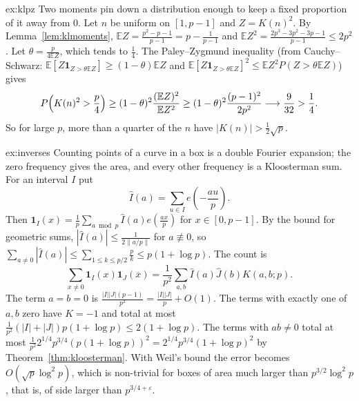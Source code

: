 \begin{solution}{ex:klpz}
\idea Two moments pin down a distribution enough to keep a fixed proportion of it away from $0$.
\writeup Let $n$ be uniform on $[1,p-1]$ and $Z=K(n)^2$. By Lemma~\ref{lem:klmoments}, $\mathbb EZ=\frac{p^2-p-1}{p-1}=p-\frac1{p-1}$ and $\mathbb EZ^2=\frac{2p^3-3p^2-3p-1}{p-1}\le2p^2$. Let $\theta=\frac p{4\mathbb EZ}$, which tends to $\frac14$. The Paley--Zygmund inequality (from Cauchy--Schwarz: $\mathbb E[Z\mathbf 1_{Z>\theta\mathbb EZ}]\ge(1-\theta)\mathbb EZ$ and $\mathbb E[Z\mathbf 1_{Z>\theta\mathbb EZ}]^2\le\mathbb EZ^2P(Z>\theta\mathbb EZ)$) gives
\[
P\Bigl(K(n)^2>\frac p4\Bigr)\ge(1-\theta)^2\frac{(\mathbb EZ)^2}{\mathbb EZ^2}\ge(1-\theta)^2\frac{(p-1)^2}{2p^2}\longrightarrow\frac9{32}>\frac14.
\]
So for large $p$, more than a quarter of the $n$ have $|K(n)|>\frac12\sqrt p$.
\end{solution}

\begin{solution}{ex:inverses}
\idea Counting points of a curve in a box is a double Fourier expansion; the zero frequency gives the area, and every other frequency is a Kloosterman sum.
\writeup For an interval $I$ put
\[
\hat I(a)=\sum_{u\in I}e\!\left(-\frac{au}p\right).
\]
Then $\mathbf 1_I(x)=\frac1p\sum_{a\bmod p}\hat I(a)e(\frac{ax}p)$ for $x\in[0,p-1]$. By the bound for geometric sums, $|\hat I(a)|\le\frac1{2\|a/p\|}$ for $a\not\equiv0$, so $\sum_{a\ne0}|\hat I(a)|\le\sum_{1\le k\le p/2}\frac pk\le p(1+\log p)$. The count is
\[
\sum_{x\ne0}\mathbf 1_I(x)\mathbf 1_J(\overline x)=\frac1{p^2}\sum_{a,b}\hat I(a)\hat J(b)K(a,b;p).
\]
The term $a=b=0$ is $\frac{|I||J|(p-1)}{p^2}=\frac{|I||J|}p+O(1)$. The terms with exactly one of $a,b$ zero have $K=-1$ and total at most $\frac1{p^2}(|I|+|J|)p(1+\log p)\le2(1+\log p)$. The terms with $ab\ne0$ total at most $\frac1{p^2}2^{1/4}p^{3/4}(p(1+\log p))^2=2^{1/4}p^{3/4}(1+\log p)^2$ by Theorem~\ref{thm:kloosterman}. With Weil's bound the error becomes $O(\sqrt p\log^2p)$, which is non-trivial for boxes of area much larger than $p^{3/2}\log^2p$, that is, of side larger than $p^{3/4+\varepsilon}$.
\end{solution}


